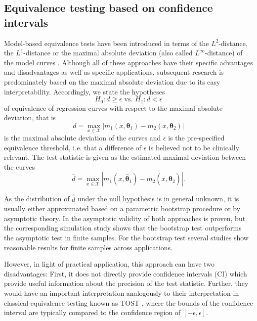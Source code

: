 {\subsection{Equivalence testing based on confidence intervals} \label{sec:EquiTest:CI}
Model-based equivalence tests have been introduced in terms of the $L^2$-distance, the $L^1$-distance or the maximal absolute deviation (also called $L^\infty$-distance) of the model curves \citep{Dette2018, Bastian2024}. 
Although all of these approaches have their specific advantages and disadvantages as well as specific applications, subsequent research \citep[see, e.g.,][]{Moellenhoff2018, Moellenhoff2020, Moellenhoff2021, Hagemann2024} is predominately based on the maximal absolute deviation due to its easy interpretability.
Accordingly, we state the hypotheses 
\begin{equation} \label{eq:hypotheses}
    H_0: d \geq \epsilon \text{   vs.   } H_1: d < \epsilon
\end{equation}
of equivalence of regression curves with respect to 
the maximal absolute deviation,
that is
$$
d = \max_{x \in \mathcal{X}}|m_1(x, \boldsymbol{\theta}_{1}) - m_2(x, \boldsymbol{\theta}_{2})|
$$
is the maximal absolute deviation of the curves and $\epsilon$ is the pre-specified equivalence threshold, i.e. that a difference of $\epsilon$ is believed
not to be clinically relevant.
The test statistic is given as the estimated maximal deviation between the curves
\begin{equation} \label{eq:test_stat}
    \hat{d} = \max_{x \in \mathcal{X}}|m_1(x, \hat{\boldsymbol{\theta}}_{1}) - m_2(x, \hat{\boldsymbol{\theta}}_{2})|.
\end{equation}

 As the distribution of $\hat d$ under the null hypothesis is in general unknown, it is usually either approximated based on a parametric bootstrap procedure or by asymptotic theory.
In \citet{Dette2018} the asymptotic validity of both approaches is proven, but the corresponding simulation study shows that the bootstrap test outperforms the asymptotic test in finite samples. For the bootstrap test several studies \citep[see, e.g.,][]{Dette2018, Moellenhoff2018, Moellenhoff2020} show reasonable results for finite samples across applications. 

However, in light of practical application, this approach can have two disadvantages: First, it does not directly provide confidence intervals (CI) which provide useful information about the precision of the test statistic. 
Further, they would have an important interpretation analogously to their interpretation in classical equivalence testing known as TOST \citep[two one-sided tests;][]{Schuirmann1987}, where the bounds of the confidence interval are typically compared to the confidence region of $[-\epsilon,\epsilon]$. 

}
